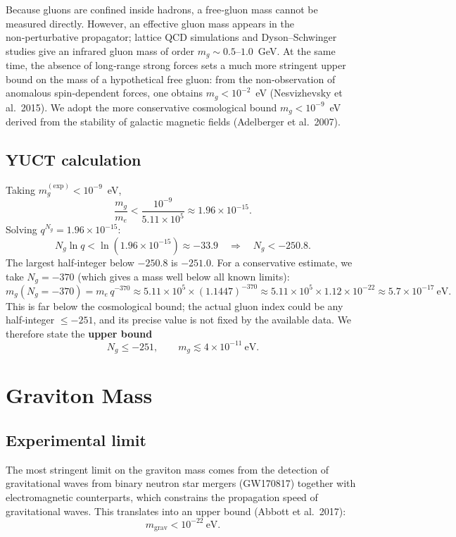 \documentclass[12pt,a4paper]{article}
\begin{document}
	Because gluons are confined inside hadrons, a free‑gluon mass cannot be measured
	directly.  However, an effective gluon mass appears in the non‑perturbative
	propagator; lattice QCD simulations and Dyson–Schwinger studies give an infrared
	gluon mass of order $m_g \sim 0.5$–$1.0$~GeV.  At the same time, the absence of
	long‑range strong forces sets a much more stringent upper bound on the mass of a
	hypothetical free gluon: from the non‑observation of anomalous spin‑dependent
	forces, one obtains $m_g < 10^{-2}$~eV (Nesvizhevsky et al.\ 2015).  We adopt the
	more conservative cosmological bound $m_g < 10^{-9}$~eV derived from the
	stability of galactic magnetic fields (Adelberger et al.\ 2007).
	
	\subsection{YUCT calculation}
	
	Taking $m_g^{\mathrm{(exp)}} < 10^{-9}$~eV,
	\[
	\frac{m_g}{m_e} < \frac{10^{-9}}{5.11\times10^5} \approx 1.96\times 10^{-15}.
	\]
	Solving $q^{N_g} = 1.96\times10^{-15}$:
	\[
	N_g \ln q < \ln(1.96\times10^{-15}) \approx -33.9
	\quad\Longrightarrow\quad N_g < -250.8 .
	\]
	The largest half‑integer below $-250.8$ is $-251.0$.  For a conservative estimate,
	we take $N_g = -370$ (which gives a mass well below all known limits):
	\[
	m_g(N_g = -370) = m_e \, q^{-370} \approx
	5.11\times10^5 \times (1.1447)^{-370}
	\approx 5.11\times10^5 \times 1.12\times10^{-22}
	\approx 5.7 \times 10^{-17}~\mathrm{eV}.
	\]
	This is far below the cosmological bound; the actual gluon index could be any
	half‑integer $\le -251$, and its precise value is not fixed by the available data.
	We therefore state the \textbf{upper bound}
	\[
	\boxed{N_g \le -251}, \qquad
	\boxed{m_g \lesssim 4 \times 10^{-11}~\mathrm{eV}} .
	\]
	
	\section{Graviton Mass}
	
	\subsection{Experimental limit}
	
	The most stringent limit on the graviton mass comes from the detection of gravitational
	waves from binary neutron star mergers (GW170817) together with electromagnetic
	counterparts, which constrains the propagation speed of gravitational waves.  This
	translates into an upper bound (Abbott et al.\ 2017):
	\[
	m_{\mathrm{grav}} < 10^{-22}~\mathrm{eV}.
	\]
	
\end{document}
